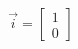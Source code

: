 \documentclass[preview]{standalone}
\begin{document}
\begin{align*}
\vec{i} = \begin{bmatrix} 1 \\ 0 \end{bmatrix}
\end{align*}
\end{document}

